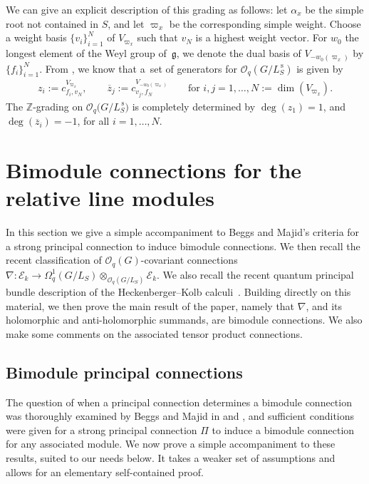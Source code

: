 \documentclass[10pt,a4paper]{amsart}
\numberwithin{equation}{section}
\begin{document}
We can give an explicit description of this grading as follows: let $\alpha_x$ be the simple root not contained in $S$, and let $\varpi_x$ be the corresponding simple weight. Choose a weight basis $\{v_i\}_{i=1}^{N}$ of $V_{\varpi_x}$ such that $v_{N}$ is a highest weight vector. For $w_0$ the longest element of the Weyl group of~$\mathfrak{g}$, we denote the dual basis of $V_{-w_0(\varpi_x)}$ by $\{f_i\}_{i=1}^{N}$.
From \cite[Theorem~4.1]{Stok}, we know that a~set of generators for $\mathcal{O}_q(G/L^{\,\mathrm{s}}_S)$ is given by
\begin{gather*}
z_{i} := c^{V_{\varpi_x}}_{f_i,v_N}, \qquad \overline{z}_j := c^{V_{-w_0(\varpi_x)}}_{v_j,f_N} \qquad \text{for } i,j = 1, \dots, N := \dim(V_{\varpi_x}).
\end{gather*}
The $\mathbb{Z}$-grading on $\mathcal{O}_q\big(G/L^{\,\mathrm{s}}_S\big)$ is completely determined by $\deg(z_1) = 1$, and $\deg(\overline{z}_i) = -1$, for all $i = 1, \dots, N$.

\section{Bimodule connections for the relative line modules}\label{section3}

In this section we give a simple accompaniment to Beggs and Majid's criteria for a strong principal connection to induce bimodule connections. We then recall the recent classification of $\mathcal{O}_q(G)$-covariant connections $\nabla\colon \mathcal{E}_k \to \Omega^1_q(G/L_S) \otimes_{\mathcal{O}_q(G/L_S)} \mathcal{E}_k$. We also recall the recent quantum principal bundle description of the Heckenberger--Kolb calculi~\cite{CDOBBW}. Building directly on this material, we then prove the main result of the paper, namely that $\nabla$, and its holomorphic and anti-holomorphic summands, are bimodule connections. We also make some comments on the associated tensor product connections.

 \subsection{Bimodule principal connections}\label{section3.1}

 The question of when a principal connection determines a bimodule connection was thoroughly examined by Beggs and Majid in \cite[Section~5.4]{BeggsMajid:Leabh} and \cite[Proposition~5.54]{BeggsMajid:Leabh}, and sufficient conditions were given for a strong principal connection $\Pi$ to induce a bimodule connection for any associated module. We now prove a simple accompaniment to these results, suited to our needs below. It takes a weaker set of assumptions and allows for an elementary self-contained proof.
\end{document}
